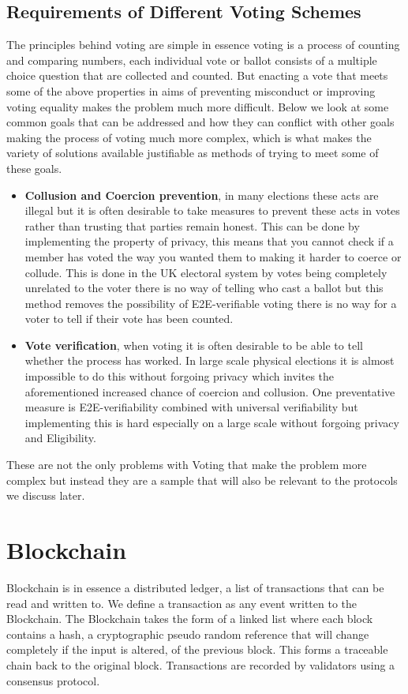 \documentclass{llncs}
\begin{document}
\subsection{Requirements of Different Voting Schemes}
The principles behind voting are simple in essence voting is a process of counting and comparing numbers, each individual vote or ballot consists of a multiple choice question that are collected and counted. But enacting a vote that meets some of the above properties in aims of preventing misconduct or improving voting equality makes the problem much more difficult. Below we look at some common goals that can be addressed and how they can conflict with other goals making the process of voting much more complex, which is what makes the variety of solutions available justifiable as methods of trying to meet some of these goals.
\begin{itemize}
    \item \textbf{Collusion and Coercion prevention}, in many elections these acts are illegal but it is often desirable to take measures to prevent these acts in votes rather than trusting that parties remain honest. This can be done by implementing the property of privacy, this means that you cannot check if a member has voted the way you wanted them to making it harder to coerce or collude. This is done in the UK electoral system by votes being completely unrelated to the voter there is no way of telling who cast a ballot but this method removes the possibility of E2E-verifiable voting there is no way for a voter to tell if their vote has been counted.
    \item \textbf{Vote verification}, when voting it is often desirable to be able to tell whether the process has worked. In large scale physical elections it is almost impossible to do this without forgoing privacy which invites the aforementioned increased chance of coercion and collusion. One preventative measure is E2E-verifiability combined with universal verifiability but implementing this is hard especially on a large scale without forgoing privacy and Eligibility.
\end{itemize}
These are not the only problems with Voting that make the problem more complex but instead they are a sample that will also be relevant to the protocols we discuss later.

\section{Blockchain}
Blockchain is in essence a distributed ledger, a list of transactions that can be read and written to. We define a transaction as any event written to the Blockchain. The Blockchain takes the form of a linked list \cite{blockchainBeginners} where each block contains a hash, a cryptographic pseudo random reference that will change completely if the input is altered, of the previous block. This forms a traceable chain back to the original block. Transactions are recorded by validators using a consensus protocol.
\end{document}
